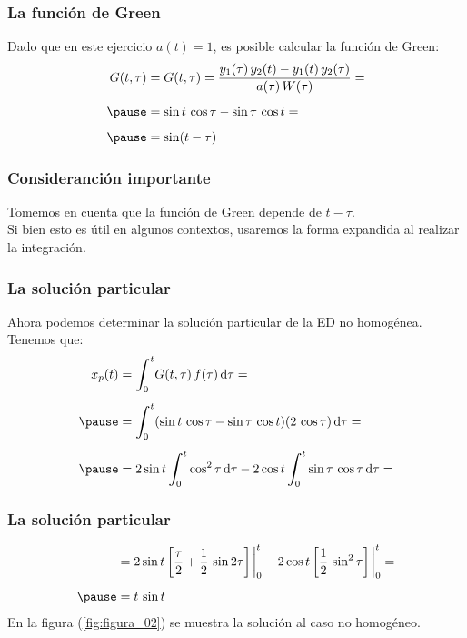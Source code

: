 \documentclass[12pt]{beamer}
\begin{document}
\begin{frame}
\frametitle{La función de Green}
Dado que en este ejercicio $a (t) = 1$, es posible calcular la función de Green:
\pause
\begin{eqnarray}
\begin{aligned}[b]
G (t, \tau) &= G (t, \tau) = \dfrac{y_{1} (\tau) \, y_{2} (t) - y_{1} (t) \, y_{2} (\tau)}{a (\tau) \, W (\tau)} = \\[0.5em] \pause
&= \sin t \, \cos \tau - \sin \tau \, \cos t = \\[0.5em] \pause
&= \sin (t - \tau)
\end{aligned}
\label{eq:ecuacion_07_23}
\end{eqnarray}
\end{frame}

\begin{frame}
\frametitle{Consideranción importante}
Tomemos en cuenta que la función de Green depende de $t - \tau$.
\\
\bigskip
\pause
Si bien esto es útil en algunos contextos, usaremos la forma expandida al realizar la integración.
\end{frame}
\begin{frame}
\frametitle{La solución particular}
Ahora podemos determinar la solución particular de la ED no homogénea. \pause Tenemos que:
\pause
\begin{eqnarray*}
\begin{aligned}
x_{p} (t) &= \scaleint{6ex}_{\bs 0}^{t} G (t, \tau) \, f (\tau) \dd{\tau} = \\[0.5em]  \pause
&= \scaleint{6ex}_{\bs 0}^{t} (\sin t \, \cos \tau - \sin \tau \, \cos t) (2 \, \cos \tau) \dd{\tau} = \\[0.5em] \pause
&= 2 \sin t \, \scaleint{6ex}_{\bs 0}^{t} \cos^{2} \tau \dd{\tau} - 2 \cos t \, \scaleint{6ex}_{\bs 0}^{t} \sin \tau \, \cos \tau \dd{\tau} =
\end{aligned}
\end{eqnarray*}
\end{frame}
\begin{frame}
\frametitle{La solución particular}
\begin{eqnarray}
\begin{aligned}    
&= 2 \sin t \, \bigg[ \dfrac{\tau}{2} + \dfrac{1}{2} \, \sin 2 \tau \bigg] \eval_{0}^{t} - 2 \cos t \, \bigg[ \dfrac{1}{2} \, \sin^{2} \tau \bigg] \eval_{0}^{t} = \\[0.5em] \pause
&= t \, \sin t
\end{aligned}
\label{eq:ecuacion_07_24}
\end{eqnarray}
En la figura (\ref{fig:figura_02}) se muestra la solución al caso no homogéneo.
\end{frame}
\end{document}

